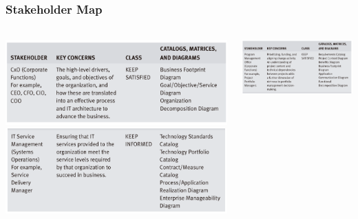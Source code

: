 \documentclass[aspectratio=169, table]{beamer}
\begin{document}
	{
		\begin{frame}
			\frametitle{Stakeholder Map}
			\framesubtitle{\hspace{1cm}}
			\begin{columns}
				\begin{column}{0.5\textwidth}
					\begin{center}
						\includegraphics[width=\textwidth]{../figures/stakeholder_map_1}
						\includegraphics[width=\textwidth]{../figures/stakeholder_map_3}
					\end{center}
					
				\end{column}
				\begin{column}{0.5\textwidth}
					\begin{center}
						\includegraphics[width=\textwidth]{../figures/stakeholder_map_2}
					\end{center}
				\end{column}
			\end{columns}
			
		\end{frame}
	}
	
\end{document}

